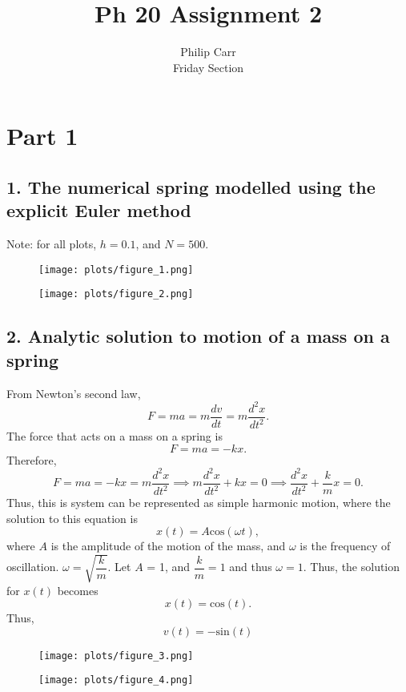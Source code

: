\documentclass{article}
\title{Ph 20 Assignment 2}
\author{Philip Carr\\Friday Section}
\date{}
\begin{document}
\maketitle

\section*{Part 1}
\subsection*{1. The numerical spring modelled using the explicit Euler method}
Note: for all plots, $h = 0.1$, and $N = 500$.

\begin{figure}[H]
\centering
\texttt{[image: plots/figure\_1.png]}
\end{figure}

\begin{figure}[H]
\centering
\texttt{[image: plots/figure\_2.png]}
\end{figure}

\subsection*{2. Analytic solution to motion of a mass on a spring}
From Newton's second law,
\[ F = ma = m\dfrac{dv}{dt} = m\dfrac{d^2 x}{dt^2}. \]
The force that acts on a mass on a spring is
\[ F = ma = -kx. \]
Therefore,
\[ F = ma = -kx = m\dfrac{d^2 x}{dt^2} \implies m\dfrac{d^2 x}{dt^2} + kx = 0 \implies \dfrac{d^2 x}{dt^2} + \dfrac{k}{m}x = 0. \]
Thus, this is system can be represented as simple harmonic motion, where the solution to this equation is
\[ x(t) = A\text{cos}(\omega t), \]
where $A$ is the amplitude of the motion of the mass, and $\omega$ is the frequency of oscillation. $\omega = \sqrt{\dfrac{k}{m}}$. Let $A$ = 1, and $\dfrac{k}{m} = 1$ and thus $\omega = 1$. Thus, the solution for $x(t)$ becomes
\[ x(t) = \text{cos}(t). \]
Thus,
\[ v(t) = -\text{sin}(t) \]

\begin{figure}[H]
\centering
\texttt{[image: plots/figure\_3.png]}
\end{figure}

\begin{figure}[H]
\centering
\texttt{[image: plots/figure\_4.png]}
\end{figure}
\end{document}
